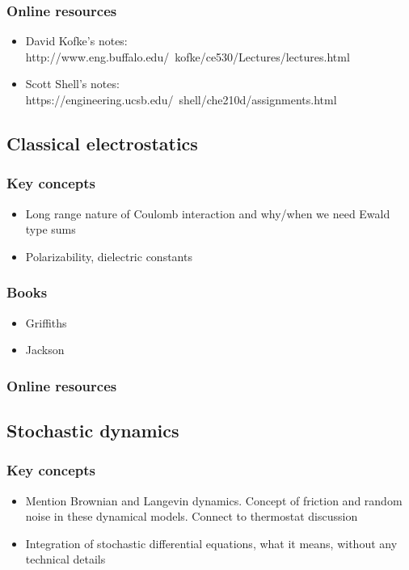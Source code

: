 \documentclass[9pt,bestpractices]{livecoms}
\begin{document}
\subsubsection{Online resources}
\begin{itemize}
\item David Kofke’s notes: http://www.eng.buffalo.edu/~kofke/ce530/Lectures/lectures.html
\item Scott Shell’s notes: https://engineering.ucsb.edu/~shell/che210d/assignments.html
\end{itemize}

\subsection{Classical electrostatics}
\subsubsection{Key concepts}
\begin{itemize}
\item Long range nature of Coulomb interaction and why/when we need Ewald type sums
\item Polarizability, dielectric constants
\end{itemize}
\subsubsection{Books}
\begin{itemize}
\item Griffiths
\item Jackson
\end{itemize}
\subsubsection{Online resources}

\subsection{Stochastic dynamics}
\subsubsection{Key concepts}
\begin{itemize}
\item Mention Brownian and Langevin dynamics. Concept of friction and random noise in these dynamical models. Connect to thermostat discussion
\item Integration of stochastic differential equations, what it means, without any technical details
\end{itemize}
\end{document}

